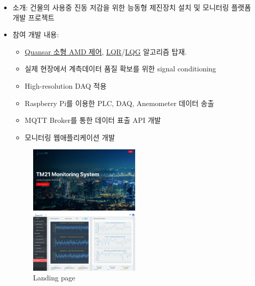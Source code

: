 \documentclass[10pt,a4paper,ragged2e]{altacv}
\begin{document}
\begin{fullwidth}
	\divider


	\begin{itemize}
		\item 소개: 건물의 사용중 진동 저감을 위한 능동형 제진장치 설치 및 모니터링 플랫폼 개발 프로젝트
		\item 참여 개발 내용:
		      \begin{itemize}
			      \item \href{http://www.quanser.com/products/active_mass_damper}{Quansar 소형 AMD 제어}, \href{https://en.wikipedia.org/wiki/Linear-quadratic_regulator}{LQR}/\href{https://en.wikipedia.org/wiki/Linear-quadratic-Gaussian_control}{LQG} 알고리즘 탑재.
			      \item 실제 현장에서 계측데이터 품질 확보를 위한 signal conditioning
			      \item High-resolution DAQ 적용
			      \item Raspberry Pi를 이용한 PLC, DAQ, Anemometer 데이터 송출
			      \item MQTT Broker를 통한 데이터 표출 API 개발
			      \item 모니터링 웹애플리케이션 개발
		      \end{itemize}
		      \begin{figure}[!ht]
			      \begin{fullwidth}
				      \parbox{0.5\textwidth}{
					      \centering
					      \includegraphics[width=0.5\textwidth]{images/TM21 Vibration Controller Monitroing - landing.png}
					      \caption*{Landing page}
				      }\qquad
				      \parbox{0.5\textwidth}{
					      \centering
					      \includegraphics[width=0.5\textwidth]{images/TM21 Vibration Controller Monitroing - amd1}
}
\end{fullwidth}
\end{figure}
\end{itemize}
\end{fullwidth}
\end{document}

